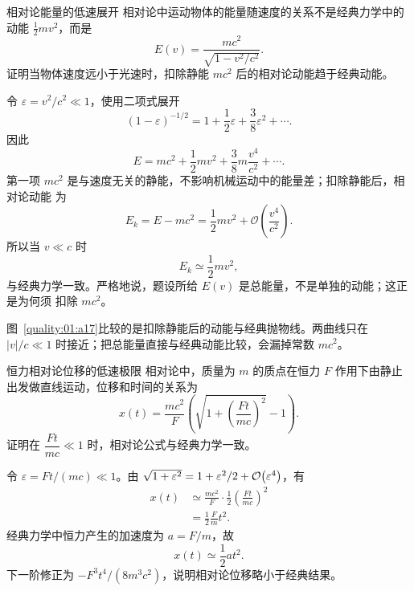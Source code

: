 {\begin{origexamplebox}{相对论能量的低速展开}\label{ch01:ex:s14-1-13}
相对论中运动物体的能量随速度的关系不是经典力学中的动能 $\frac12mv^2$，而是
\[
 E(v)=\frac{mc^2}{\sqrt{1-v^2/c^2}}.
\]
证明当物体速度远小于光速时，扣除静能 $mc^2$ 后的相对论动能趋于经典动能。

\end{origexamplebox}

\begin{xesolution}
令 $\varepsilon=v^2/c^2\ll1$，使用二项式展开
\[
 (1-\varepsilon)^{-1/2}
 =1+\frac12\varepsilon+\frac38\varepsilon^2+\cdots.
\]
因此
\[
 E=mc^2+\frac12mv^2+\frac38m\frac{v^4}{c^2}+\cdots.
\]
第一项 $mc^2$ 是与速度无关的静能，不影响机械运动中的能量差；扣除静能后，相对论动能
为
\[
 E_k=E-mc^2=\frac12mv^2+\mathcal O\!\left(\frac{v^4}{c^2}\right).
\]
所以当 $v\ll c$ 时
\[
 \boxed{E_k\simeq\frac12mv^2},
\]
与经典力学一致。严格地说，题设所给 $E(v)$ 是总能量，不是单独的动能；这正是为何须
扣除 $mc^2$。


图~\ref{quality:01:a17}比较的是扣除静能后的动能与经典抛物线。两曲线只在 $|v|/c\ll1$ 时接近；把总能量直接与经典动能比较，会漏掉常数 $mc^2$。
\end{xesolution}

\begin{origexamplebox}{恒力相对论位移的低速极限}\label{ch01:ex:s14-1-14}
相对论中，质量为 $m$ 的质点在恒力 $F$ 作用下由静止出发做直线运动，位移和时间的关系为
\[
 x(t)=\frac{mc^2}{F}
 \left(\sqrt{1+\left(\frac{Ft}{mc}\right)^2}-1\right).
\]
证明在 $\dfrac{Ft}{mc}\ll1$ 时，相对论公式与经典力学一致。

\end{origexamplebox}

\begin{xesolution}
令 $\varepsilon=Ft/(mc)\ll1$。由
$\sqrt{1+\varepsilon^2}=1+\varepsilon^2/2+\mathcal O\!\left(\varepsilon^4\right)$，有
\begin{align*}
 x(t)
 &\simeq\frac{mc^2}{F}\cdot\frac12
 \left(\frac{Ft}{mc}\right)^2\\
 &=\frac12\frac{F}{m}t^2.
\end{align*}
经典力学中恒力产生的加速度为 $a=F/m$，故
\[
 \boxed{x(t)\simeq\frac12at^2}.
\]
下一阶修正为 $-F^3t^4/(8m^3c^2)$，说明相对论位移略小于经典结果。


\end{xesolution}}
